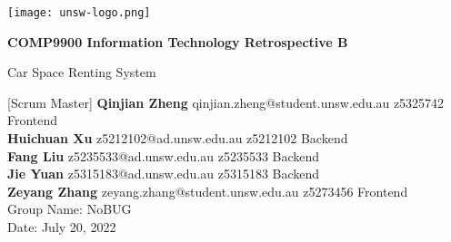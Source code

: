 \begin{titlepage}
  \begin{center}
      \vspace*{1cm}

      \texttt{[image: unsw-logo.png]}

      \Huge
      \textbf{COMP9900 Information Technology Retrospective B}

      \vspace{0.5cm}
      \LARGE
      Car Space Renting System
           
      \vspace{1.5cm}
      \large
      [Scrum Master]
      \textbf{Qinjian Zheng} qinjian.zheng@student.unsw.edu.au z5325742 Frontend\\
      \textbf{Huichuan Xu} z5212102@ad.unsw.edu.au z5212102 Backend\\
      \textbf{Fang Liu} z5235533@ad.unsw.edu.au z5235533 Backend\\
      \textbf{Jie Yuan} z5315183@ad.unsw.edu.au z5315183 Backend\\
      \textbf{Zeyang Zhang} zeyang.zhang@student.unsw.edu.au z5273456 Frontend\\

      \vfill
      \Large
      Group Name: NoBUG\\
      Date: July 20, 2022
           
  \end{center}
\end{titlepage}